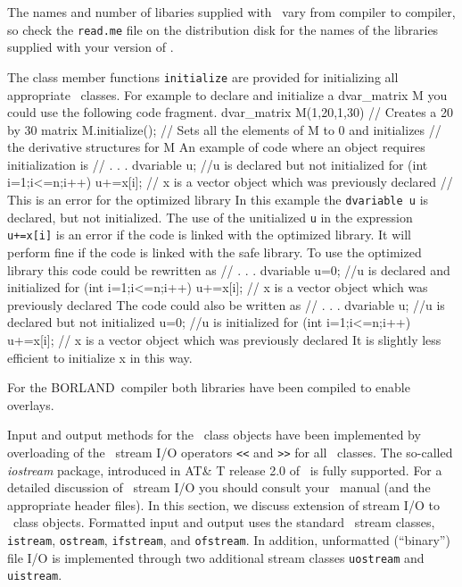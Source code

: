 \documentclass[12pt]{book}
\begin{document}
The names and number of libaries supplied with \AD\ vary from
compiler to compiler, so check the {\tt read.me} file on
the distribution disk for the names of the libraries supplied with
your version of \AD.

The class member functions {\tt initialize} are provided for initializing all
appropriate \AD\ classes. For example to declare and 
initialize a dvar\_matrix M you could use the following code fragment.
\beginexample
dvar_matrix M(1,20,1,30) // Creates a 20 by 30 matrix
M.initialize();          // Sets all the elements of M to 0 and initializes
                         // the derivative structures for M
\endexample
An example of code where an object requires initialization is 
\beginexample
{
  // . . .
  dvariable u; //u is declared but not initialized
  for (int i=1;i<=n;i++)
  {
    u+=x[i];  // x is a vector object which was previously declared
  }            // This is an error for the optimized library
 }
\endexample
\bestbreak
In this example the {\tt dvariable u} is declared, but not initialized.
The use of the unitialized {\tt u} in the expression {\tt u+=x[i]}
is an error if the code is linked with the optimized library.
It will perform fine if the code is linked with the safe library.
To use the optimized library this code could be rewritten as
\beginexample
{
  // . . .
  dvariable u=0; //u is declared and initialized
  for (int i=1;i<=n;i++)
  {
    u+=x[i];  // x is a vector object which was previously declared
  }
}
\endexample
\noindent The code could also be written as
\beginexample
{
  // . . .
  dvariable u; //u is declared but not initialized
  u=0;         //u is initialized
  for (int i=1;i<=n;i++)
  {
    u+=x[i];  // x is a vector object which was previously declared
  }
}
\endexample
\noindent It is slightly less efficient to initialize x in this way. 

For the BORLAND\cplus\ compiler both libraries have been 
compiled to enable overlays.


\endchapter


\htmlnewfile 
Input and output methods for the \AD\ class objects  
have been implemented by
overloading of the \cplus\ stream I/O operators {\tt <<}
and {\tt >>} for all \AD\ classes.
The so-called {\it iostream} package, introduced in 
AT\& T release 2.0 of \cplus\ is fully supported. 
For a detailed discussion of \cplus\ stream I/O you should
consult your \cplus\ manual (and the appropriate header files).
In this section, we
discuss extension of stream I/O to \AD\ class objects. 
Formatted input and output uses the standard \cplus\ stream classes, 
{\tt istream}, {\tt ostream}, {\tt ifstream}, and {\tt ofstream}. 
In addition, unformatted (``binary'') file I/O is implemented
through two additional stream classes {\tt uostream} and {\tt uistream}.
\end{document}
